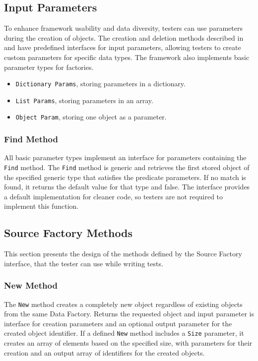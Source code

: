 \subsection{Input Parameters}
To enhance framework usability and data diversity, testers can use parameters during the creation of objects. The creation and deletion methods described in  and  have predefined interfaces for input parameters, allowing testers to create custom parameters for specific data types. The framework also implements basic parameter types for factories.
\begin{itemize}
    \item \texttt{Dictionary Params}, storing parameters in a dictionary.
    \item \texttt{List Params}, storing parameters in an array.
    \item \texttt{Object Param}, storing one object as a parameter.
\end{itemize}

\subsubsection{Find Method}
All basic parameter types implement an interface for parameters containing the \texttt{Find} method. The \texttt{Find} method is generic and retrieves the first stored object of the specified generic type that satisfies the predicate parameters. If no match is found, it returns the default value for that type and false. The interface provides a default implementation for cleaner code, so testers are not required to implement this function.

\subsection{Source Factory Methods}
This section presents the design of the methods defined by the Source Factory interface, that the tester can use while writing tests.

\subsubsection{New Method}\label{subsec:new}
The \texttt{New} method creates a completely new object regardless of existing objects from the same Data Factory. Returns the requested object and input parameter is interface for creation parameters and an optional output parameter for the created object identifier. If a defined \texttt{New} method includes a \texttt{Size} parameter, it creates an array of elements based on the specified size, with parameters for their creation and an output array of identifiers for the created objects.

